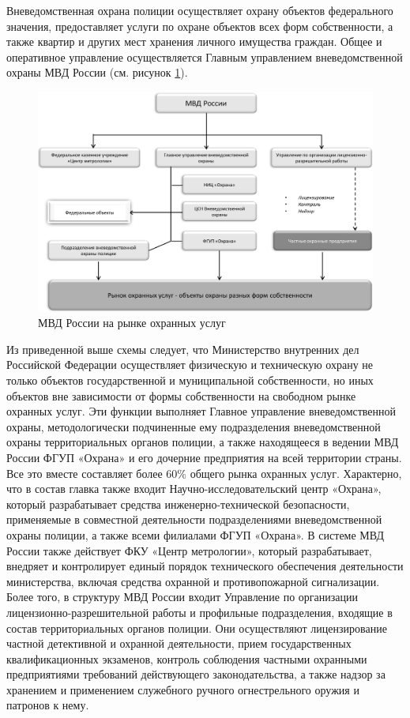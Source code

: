 \documentclass[a4paper,12pt,fleqn]{article} %
\begin{document}
Вневедомственная охрана полиции осуществляет охрану объектов федерального значения, предоставляет услуги по охране объектов всех форм собственности, а также квартир и других мест хранения личного имущества граждан. Общее и оперативное управление осуществляется Главным управлением вневедомственной охраны МВД России (см. рисунок \ref{image6}).

\begin{figure}[h]
	\centering
	\includegraphics[scale=0.7]{img6}
	\caption{МВД России на рынке охранных услуг}
	\label{image6}
\end{figure}

Из приведенной выше схемы следует, что Министерство внутренних дел Российской Федерации осуществляет физическую и техническую охрану не только объектов государственной и муниципальной собственности, но иных объектов вне зависимости от формы собственности на свободном рынке охранных услуг. Эти функции выполняет Главное управление вневедомственной охраны, методологически подчиненные ему подразделения вневедомственной охраны территориальных органов полиции, а также находящееся в ведении МВД России ФГУП «Охрана» и его дочерние предприятия на всей территории страны. Все это вместе составляет более 60\% общего рынка охранных услуг. Характерно, что в состав главка также входит Научно-исследовательский центр «Охрана», который разрабатывает средства инженерно-технической безопасности, применяемые в совместной деятельности подразделениями вневедомственной охраны полиции, а также всеми филиалами ФГУП «Охрана». В системе МВД России также действует ФКУ «Центр метрологии», который разрабатывает, внедряет и контролирует единый порядок технического обеспечения деятельности министерства, включая средства охранной и противопожарной сигнализации. Более того, в структуру МВД России входит Управление по организации лицензионно-разрешительной работы и профильные подразделения, входящие в состав территориальных органов полиции. Они осуществляют лицензирование частной детективной и охранной деятельности, прием государственных квалификационных экзаменов, контроль соблюдения частными охранными предприятиями требований действующего законодательства, а также надзор за хранением и применением служебного ручного огнестрельного оружия и патронов к нему.
\end{document}

